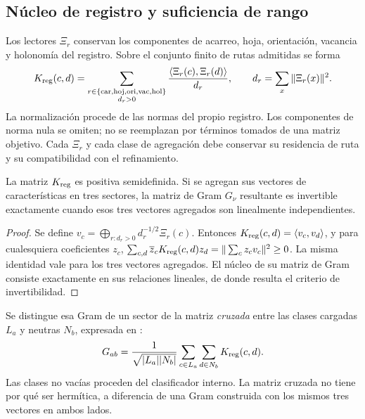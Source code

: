 \subsection{Núcleo de registro y suficiencia de rango}

Los lectores \(\Xi_r\) conservan los componentes de acarreo, hoja,
orientación, vacancia y holonomía del registro. Sobre el conjunto finito
de rutas admitidas se forma
\begin{equation}
 K_{\rm reg}(c,d)=
 \sum_{\substack{r\in\{\mathrm{car},\mathrm{hoj},\mathrm{ori},
                           \mathrm{vac},\mathrm{hol}\}\\ d_r>0}}
 \frac{\langle\Xi_r(c),\Xi_r(d)\rangle}{d_r},
 \qquad
 d_r=\sum_x\|\Xi_r(x)\|^2.
 \label{eq:ii-reg-kernel}
\end{equation}
La normalización procede de las normas del propio registro. Los
componentes de norma nula se omiten; no se reemplazan por términos tomados
de una matriz objetivo. Cada \(\Xi_r\) y cada clase de agregación debe
conservar su residencia de ruta y su compatibilidad con el refinamiento.

\begin{proposition}
La matriz \(K_{\rm reg}\) es positiva semidefinida. Si se agregan sus
vectores de características en tres sectores, la matriz de Gram
\(G_\nu\) resultante es invertible exactamente cuando esos tres vectores
agregados son linealmente independientes.
\end{proposition}

\begin{proof}
Se define
\(v_c=\bigoplus_{r:d_r>0}d_r^{-1/2}\Xi_r(c)\).
Entonces \(K_{\rm reg}(c,d)=\langle v_c,v_d\rangle\), y para
cualesquiera coeficientes \(z_c\),
\(\sum_{c,d}\overline z_cK_{\rm reg}(c,d)z_d
=\|\sum_c z_cv_c\|^2\ge0\).
La misma identidad vale para los tres vectores agregados.
El núcleo de su matriz de Gram consiste exactamente en sus relaciones
lineales, de donde resulta el criterio de invertibilidad.
\end{proof}

Se distingue esa Gram de un sector de la matriz \emph{cruzada} entre las
clases cargadas \(L_a\) y neutras \(N_b\), expresada en \cite{mezcla}:
\begin{equation}
 G_{ab}=\frac1{\sqrt{|L_a||N_b|}}
       \sum_{c\in L_a}\sum_{d\in N_b}K_{\rm reg}(c,d).
 \label{eq:ii-cross-gram}
\end{equation}
Las clases no vacías proceden del clasificador interno. La matriz cruzada
no tiene por qué ser hermítica, a diferencia de una Gram construida con
los mismos tres vectores en ambos lados.

